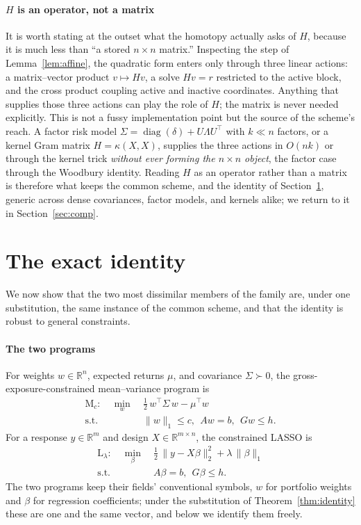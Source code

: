 \documentclass[sts]{imsart}
\newcommand{\R}{\mathbb{R}}
\newcommand{\Sig}{\Sigma}
\newcommand{\trans}{^{\top}}
\theoremstyle{plain}
\theoremstyle{definition}
\begin{document}
\paragraph{$H$ is an operator, not a matrix}
It is worth stating at the outset what the homotopy actually asks of $H$, because it is
much less than ``a stored $n\times n$ matrix.'' Inspecting the step of
Lemma~\ref{lem:affine}, the quadratic form enters only through three linear actions:
a matrix--vector product $v\mapsto Hv$, a solve $Hv = r$ restricted to the active
block, and the cross product coupling active and inactive coordinates. Anything that
supplies those three actions can play the role of $H$; the matrix is never needed
explicitly. This is not a fussy implementation point but the source of the scheme's
reach. A factor risk model $\Sig = \operatorname{diag}(\delta) + U\Lambda U\trans$
with $k\ll n$ factors, or a kernel Gram matrix $H = \kappa(X,X)$, supplies the three
actions in $O(nk)$ or through the kernel trick \emph{without ever forming the
$n\times n$ object}, the factor case through the Woodbury identity. Reading $H$ as an
operator rather than a matrix is therefore what keeps the common scheme, and the
identity of Section~\ref{sec:identity}, generic across dense covariances, factor
models, and kernels alike; we return to it in Section~\ref{sec:comp}.

\section{The exact identity}
\label{sec:identity}

We now show that the two most dissimilar members of the family are, under one
substitution, the same instance of the common scheme, and that the identity is robust
to general constraints.

\paragraph{The two programs}
For weights $w\in\R^n$, expected returns $\mu$, and covariance $\Sig\succ 0$, the
gross-exposure-constrained mean--variance program is
\begin{equation}
\label{eq:mark}
\begin{aligned}
\text{M}_c:\quad \min_{w}\ &\tfrac12\, w\trans \Sig\, w - \mu\trans w \\
\text{s.t.}\quad &\|w\|_1 \le c,\ \ A w = b,\ \ G w \le h .
\end{aligned}
\end{equation}
For a response $y\in\R^m$ and design $X\in\R^{m\times n}$, the constrained LASSO is
\begin{equation}
\label{eq:lasso}
\begin{aligned}
\text{L}_\lambda:\quad \min_{\beta}\ &\tfrac12\,\|y - X\beta\|_2^2 + \lambda\,\|\beta\|_1 \\
\text{s.t.}\quad &A\beta = b,\ \ G\beta \le h .
\end{aligned}
\end{equation}
The two programs keep their fields' conventional symbols, $w$ for portfolio weights and
$\beta$ for regression coefficients; under the substitution of Theorem~\ref{thm:identity}
these are one and the same vector, and below we identify them freely.
\end{document}

